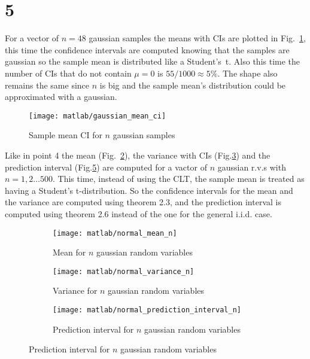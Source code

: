 \documentclass{article}
\begin{document}
\section*{5}
For a vector of $n = 48$ gaussian samples the means with CIs are
plotted in Fig.~\ref{gaussian_mean_ci}, this time the confidence
intervals are computed knowing that the samples are gaussian so the
sample mean is distributed like a Student's~t. Also this time the
number of CIs that do not contain $\mu=0$ is $55/1000 \approx 5\%$.
The shape also remains the same since $n$ is big and the sample mean's
distribution could be approximated with a gaussian.
\begin{figure}[htbp]
  \centering
  \texttt{[image: matlab/gaussian\_mean\_ci]}
  \caption{Sample mean CI for $n$ gaussian samples}
  \label{gaussian_mean_ci}
\end{figure}

Like in point 4 the mean (Fig.~\ref{gaussian_mean_n}), the variance
with CIs (Fig.\ref{gaussian_var_n}) and the prediction interval
(Fig.\ref{gaussian_pred_int_n}) are computed for a vactor of $n$
gaussian r.v.s with $n = 1,2\dots500$. This time, instead of using the
CLT, the sample mean is treated as having a Student's
t-distribution. So the confidence intervals for the mean and the
variance are computed using theorem 2.3, and the prediction interval
is computed using theorem 2.6 instead of the one for the general
i.i.d. case.
\begin{figure}[htbp]
  \centering
  \begin{subfigure}{.5\textwidth}
    \centering
    \texttt{[image: matlab/normal\_mean\_n]}
    \caption{Mean for $n$ gaussian random variables}
    \label{gaussian_mean_n}
  \end{subfigure}%
  \begin{subfigure}{.5\textwidth}
    \centering
    \texttt{[image: matlab/normal\_variance\_n]}
    \caption{Variance for $n$ gaussian random variables}
    \label{gaussian_var_n}
  \end{subfigure}
  \begin{subfigure}{.5\textwidth}
    \centering
    \texttt{[image: matlab/normal\_prediction\_interval\_n]}
    \caption{Prediction interval for $n$ gaussian random variables}
    \label{gaussian_pred_int_n}
  \end{subfigure}
\end{figure}
\end{document}
